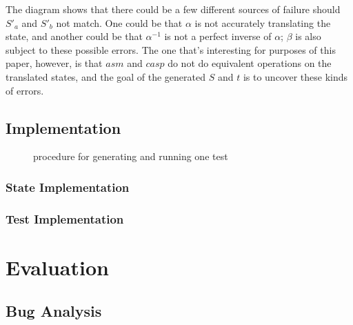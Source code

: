 \documentclass[letterpaper,12pt]{article}
\begin{document}
The diagram shows that there could be a few different sources of failure should $S'_a$ and $S'_b$ not match. One could be that $\alpha$ is not accurately translating the state, and another could be that $\alpha^{-1}$ is not a perfect inverse of $\alpha$; $\beta$ is also subject to these possible errors. The one that's interesting for purposes of this paper, however, is that $asm$ and $casp$ do not do equivalent operations on the translated states, and the goal of the generated $S$ and $t$ is to uncover these kinds of errors.

\subsection{Implementation}

\begin{figure}
\centering
{}
\caption{procedure for generating and running one test} \label{fig:M2}
\end{figure}

\subsubsection{State Implementation}

\subsubsection{Test Implementation}

\section{Evaluation}

\subsection{Bug Analysis}
\end{document}
